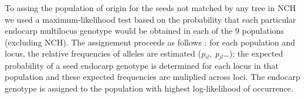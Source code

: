 \documentclass[a4paper,12pt]{article}
\begin{document}
\begin{bibunit}[science]
\begin{spacing}{2.0}
To assing the population of origin for the seeds not matched  by any tree in NCH we used a maximum-likelihood test based on  the probability that each particular endocarp multilocus genotype  would be obtained in each of the 9 populations (excluding NCH).  The assignement proceeds as follows \citep{Wilson:2003gf,Beaumont:2004lr}: for each population  and locus, the relative frequencies of alleles are estimated  (\textit{p}$_{\mathit{il}}$\textit{, p}$_{\mathit{jl}}$\dots ); the expected probability of  a seed endocarp genotype is determined for each locus in that  population and these expected frequencies are muliplied across  loci. The endocarp genotype is assigned to the population with  highest log-likelihood of occurrence.\\

\end{spacing}
\putbib[bu2]
\end{bibunit}
\end{document}
